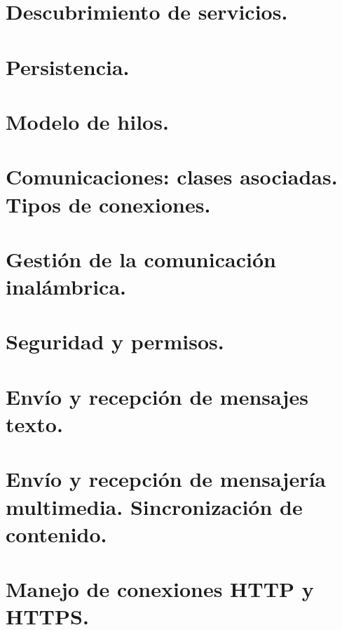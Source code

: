 \documentclass[a4paper,12pt,spanish]{sphinxmanual}
\begin{document}
\section{Descubrimiento de servicios.}
\label{tema2:descubrimiento-de-servicios}

\section{Persistencia.}
\label{tema2:persistencia}

\section{Modelo de hilos.}
\label{tema2:modelo-de-hilos}

\section{Comunicaciones: clases asociadas. Tipos de conexiones.}
\label{tema2:comunicaciones-clases-asociadas-tipos-de-conexiones}

\section{Gestión de la comunicación inalámbrica.}
\label{tema2:gestion-de-la-comunicacion-inalambrica}

\section{Seguridad y permisos.}
\label{tema2:seguridad-y-permisos}

\section{Envío y recepción de mensajes texto.}
\label{tema2:envio-y-recepcion-de-mensajes-texto}

\section{Envío y recepción de mensajería multimedia. Sincronización de contenido.}
\label{tema2:envio-y-recepcion-de-mensajeria-multimedia-sincronizacion-de-contenido}

\section{Manejo de conexiones HTTP y HTTPS.}
\label{tema2:manejo-de-conexiones-http-y-https}
\end{document}
